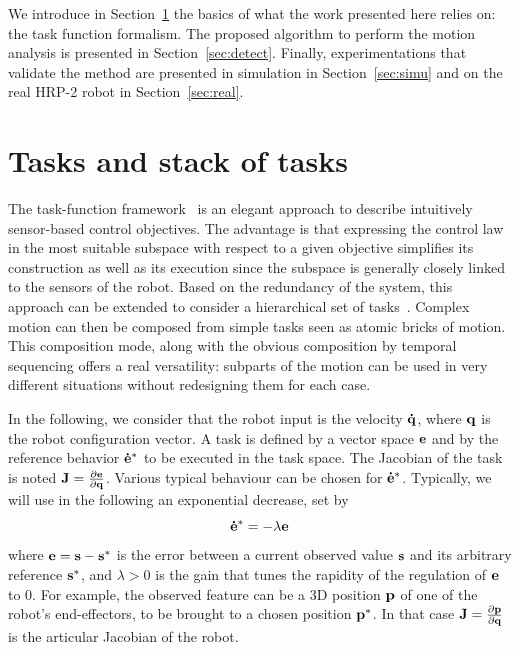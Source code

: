 \documentclass[letterpaper, 10pt, conference]{ieeeconf}      %
\begin{document}
We introduce in Section~\ref{sec:sot} the basics of what the work presented here
relies on: the task function formalism. The proposed algorithm to perform the 
motion analysis is presented in Section~\ref{sec:detect}.
Finally, experimentations that validate the method are presented in 
simulation in Section~\ref{sec:simu} and on the real HRP-2 robot in Section~\ref{sec:real}.


\section{Tasks and stack of tasks}
\label{sec:sot}
The task-function framework~\cite{samson91} is an elegant approach to describe intuitively
sensor-based control objectives. The advantage is that expressing the control law
in the most suitable subspace with respect to a given objective simplifies its construction
as well as its execution since the subspace is generally closely linked to the sensors of
the robot. Based on the redundancy of the system, this
approach can be extended to consider a hierarchical set of
tasks~\cite{siciliano91}. Complex motion can then be composed from simple tasks seen as atomic bricks
of motion. This composition mode, along with the obvious composition by temporal
sequencing offers a real versatility: subparts of the motion can be used in
very different situations without redesigning them for each case.

In the following, we consider that the robot input is the velocity ${\mathbf{\dot{q}}}$,
where ${\mathbf{q}}$ is the robot configuration vector.                   
A task is defined by a vector space 
${\mathbf{e}}$ and by the reference behavior ${\mathbf{\dot{e}^*}}$ to be
executed in the task space.  
The Jacobian of the task is noted
${\mathbf{J}}=\frac{\partial{{\mathbf{e}}}}{\partial{{\mathbf{q}}}}$. 
Various typical behaviour can be chosen for ${\mathbf{\dot{e}^*}}$. Typically, we will
use in the following an exponential decrease, set by
\begin{equation}
  {\mathbf{\dot{e}^*}} = -\lambda{\mathbf{e}}
  \label{eq:lambda}
\end{equation}
where ${\mathbf{e}} = {\mathbf{s}} - {\mathbf{s^*}}$ is the error between a current
observed value ${\mathbf{s}}$ and its arbitrary reference ${\mathbf{s^*}}$,
and $\lambda>0$ is the gain that tunes the rapidity of the regulation of ${\mathbf{e}}$ to $0$.
For example, the observed feature can be a 3D position ${\mathbf{p}}$ of one of
the robot's end-effectors, to be brought to a chosen position ${\mathbf{p^*}}$.
In that case ${\mathbf{J}} = \frac{\partial{{\mathbf{p}}}}{\partial{{\mathbf{q}}}}$ is the articular Jacobian of the robot.
\end{document}
